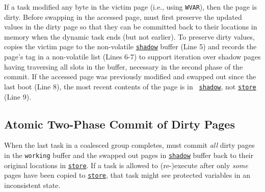 If a task modified any byte in the victim page
(i.e.,  using \texttt{WVAR}), then the page is dirty. Before swapping in the
accessed page, \sys must first preserve the updated values in the dirty page so
that they can be committed back to their locations in memory
when the dynamic task ends (but not earlier). To preserve dirty values, \sys
copies the victim page to the non-volatile \texttt{\underline{shadow}}
buffer (Line 5) and records the page's tag in a non-volatile list (Lines 6-7)
to support iteration over shadow pages having traversing all slots in the
buffer, necessary in the second phase of the commit.
%
%
If the accessed page was previously modified and
swapped out since the last boot (Line 8), the most recent contents of the page is in {\tt
\underline{shadow}}, not \texttt{\underline{store}} (Line 9).


%

\subsection{Atomic Two-Phase Commit of Dirty Pages}

When the last task in a coalesced group completes, \sys must commit \emph{all}
dirty pages in the \texttt{working} buffer and the swapped out pages in
\texttt{\underline{shadow}} buffer back to their original locations in
\texttt{\underline{store}}. If a task is allowed to (re-)execute after only
\emph{some} pages have been copied to \texttt{\underline{store}}, that task
might see protected variables in an inconsistent state.

